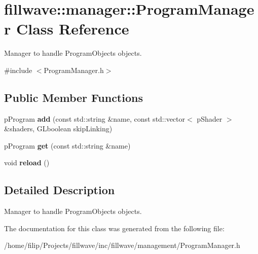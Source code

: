 \hypertarget{classfillwave_1_1manager_1_1ProgramManager}{}\section{fillwave\+:\+:manager\+:\+:Program\+Manager Class Reference}
\label{classfillwave_1_1manager_1_1ProgramManager}


Manager to handle Program\+Objects objects.  




{\ttfamily \#include $<$Program\+Manager.\+h$>$}

\subsection*{Public Member Functions}
\begin{DoxyCompactItemize}
\item 
\hypertarget{classfillwave_1_1manager_1_1ProgramManager_ad56ffd53ea11a26cb930c82ab95c368c}{}p\+Program {\bfseries add} (const std\+::string \&name, const std\+::vector$<$ p\+Shader $>$ \&shaders, G\+Lboolean skip\+Linking)\label{classfillwave_1_1manager_1_1ProgramManager_ad56ffd53ea11a26cb930c82ab95c368c}

\item 
\hypertarget{classfillwave_1_1manager_1_1ProgramManager_ad4aed421eccd22b7c0f723c4aaa3c1ee}{}p\+Program {\bfseries get} (const std\+::string \&name)\label{classfillwave_1_1manager_1_1ProgramManager_ad4aed421eccd22b7c0f723c4aaa3c1ee}

\item 
\hypertarget{classfillwave_1_1manager_1_1ProgramManager_a35936cd26e4fa6b2c7a65367996949be}{}void {\bfseries reload} ()\label{classfillwave_1_1manager_1_1ProgramManager_a35936cd26e4fa6b2c7a65367996949be}

\end{DoxyCompactItemize}


\subsection{Detailed Description}
Manager to handle Program\+Objects objects. 

The documentation for this class was generated from the following file\+:\begin{DoxyCompactItemize}
\item 
/home/filip/\+Projects/fillwave/inc/fillwave/management/Program\+Manager.\+h\end{DoxyCompactItemize}
